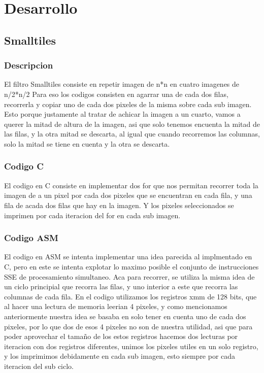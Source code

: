 \section{Desarrollo}
\subsection{Smalltiles}
\subsubsection{Descripcion}
El filtro Smalltiles consiste en repetir  imagen de n*n en cuatro imagenes de n/2*n/2
Para eso los codigos consisten en agarrar una de cada dos filas, recorrerla y copiar uno de cada dos pixeles de la misma sobre cada sub imagen. Esto porque justamente al tratar de achicar la imagen a un cuarto, vamos a querer la mitad de altura de la imagen, asi que solo tenemos encuenta la mitad de las filas, y la otra mitad se descarta, al igual que cuando recorremos las columnas, solo la mitad se tiene en cuenta y la otra se descarta.


\subsubsection{Codigo C}
El codigo en C consiste en implementar dos for que nos permitan recorrer toda la imagen de a un pixel por cada dos pixeles que se encuentran en cada fila, y una fila de acada dos filas que hay en la imagen. Y los pixeles seleccionados se imprimen por cada iteracion del for  en cada sub imagen.

\subsubsection{Codigo ASM} 
El codigo en ASM se intenta implementar una idea parecida al implmentado en C, pero en este se intenta explotar lo maximo posible el conjunto de instrucciones SSE de procesamiento simultaneo. Aca para recorrer, se utiliza la misma idea de un ciclo principial que recorra las filas, y uno interior a este que recorra las columnas de cada fila. En el codigo utilizamos los registros xmm de 128 bits,  que al hacer una lectura de memoria leerian 4 pixeles, y como mencionamos anteriormente nuestra idea se basaba en solo tener en cuenta uno de cada dos pixeles, por lo que dos de esos 4 pixeles no son de nuestra utilidad, asi que para poder aprovechar el tamaño de los estos registros hacemos dos lecturas por iteracion con dos registros diferentes, unimos los pixeles utiles en un solo registro, y los imprimimos debidamente en cada sub imagen, esto siempre por cada iteracion del sub ciclo.



